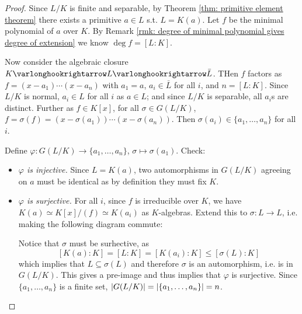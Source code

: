 \documentclass{article}
\begin{document}
\begin{proof}
    Since $L/K$ is finite and separable, by Theorem \ref{thm: primitive element theorem} there exists a primitive $a \in L$ s.t. $L = K(a)$. Let $f$ be the minimal polynomial of $a$ over $K$. By Remark \ref{rmk: degree of minimal polynomial gives degree of extension} we know $\deg f = [L : K]$.

    Now consider the algebraic closure $K \ext L \ext \bar{L}$. THen $f$ factors as $f = (x - a_1) \cdots (x - a_n)$ with $a_1 = a$, $a_i \in \bar{L}$ for all $i$, and $n = [L : K]$. Since $L/K$ is normal, $a_i \in L$ for all $i$ as $a \in L$; and since $L/K$ is separable, all $a_i$s are distinct. Further as $f \in K[x]$, for all $\sigma \in G(L/K)$, $f = \sigma(f) = (x - \sigma(a_1)) \cdots (x - \sigma(a_n))$. Then $\sigma(a_i) \in \{a_1, \dots, a_n\}$ for all $i$.

    Define $\varphi: G(L/K) \to \{a_1, \dots, a_n\}$, $\sigma \mapsto \sigma(a_1)$. Check:
    \begin{itemize}[label=$-$]
        \item \emph{$\varphi$ is injective.} Since $L = K(a)$, two automorphisms in $G(L/K)$ agreeing on $a$ must be identical as by definition they must fix $K$.
        \item \emph{$\varphi$ is surjective.} For all $i$, since $f$ is irreducible over $K$, we have $K(a) \simeq K[x]/(f) \simeq K(a_i)$ as $K$-algebras. Extend this to $\sigma: L \to L$, i.e. making the following diagram commute:

        \begin{minipage}{\linewidth}
            \centering
        \end{minipage}

        Notice that $\sigma$ must be surhective, as
        \[
            [K(a) : K] = [L : K] = [K(a_i) : K] \leq [\sigma(L) : K]
        \]
        which implies that $L \subseteq \sigma(L)$ and therefore $\sigma$ is an automorphism, i.e. is in $G(L/K)$. This gives a pre-image and thus implies that $\varphi$ is surjective. Since $\{a_1, \dots, a_n\}$ is a finite set, $\left|G(L/K)\right| = \left|\{a_1, \dots, a_n\}\right| = n$.
    \end{itemize}
\end{proof}
\end{document}
